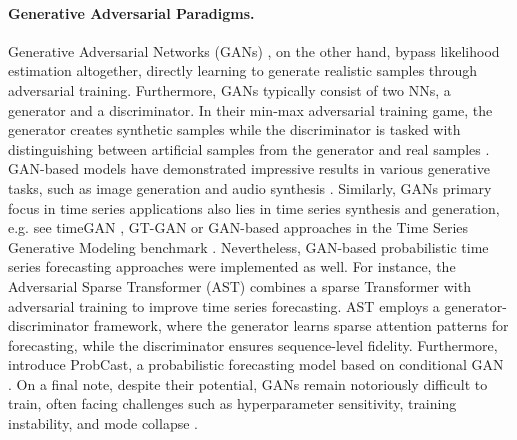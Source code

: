 \documentclass[a4paper,oneside,bibliography=totoc]{scrbook}
\begin{document}
\paragraph{Generative Adversarial Paradigms.}
Generative Adversarial Networks (GANs) \cite{goodfellow_generative_2014}, on the other hand, bypass likelihood estimation altogether, directly learning to generate realistic samples through adversarial training.
Furthermore, GANs typically consist of two NNs, a generator and a discriminator.
In their min-max adversarial training game, the generator creates synthetic samples while the discriminator is tasked with distinguishing between artificial samples from the generator and real samples \cite{wu_adversarial_2020}.
GAN-based models have demonstrated impressive results in various generative tasks, such as image generation \cite{jiang_transgan_2021} and audio synthesis \cite{donahue_adversarial_2018}.
Similarly, GANs primary focus in time series applications also lies in time series synthesis and generation, e.g. see timeGAN \cite{yoon_time-series_2019}, GT-GAN \cite{jeon_gt-gan_2022} or GAN-based approaches in the Time Series Generative Modeling benchmark \cite{nikitin_tsgm_2024}.
Nevertheless, GAN-based probabilistic time series forecasting approaches were implemented as well. 
For instance, the Adversarial Sparse Transformer (AST) \cite{wu_adversarial_2020} combines a sparse Transformer with adversarial training to improve time series forecasting. 
AST employs a generator-discriminator framework, where the generator learns sparse attention patterns for forecasting, while the discriminator ensures sequence-level fidelity. %
Furthermore, \citet{koochali_if_2021} introduce ProbCast, a probabilistic forecasting model based on conditional GAN \cite{mirza_conditional_2014}. %
On a final note, despite their potential, GANs remain notoriously difficult to train, often facing challenges such as hyperparameter sensitivity, training instability, and mode collapse \cite{yegin_generative_2024}.
\end{document}
